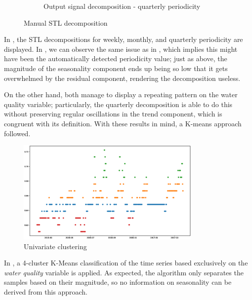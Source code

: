 \documentclass{scrartcl}
\begin{document}
\begin{figure}[ht]
\begin{subfigure}[b]{0.65\textwidth}
      \caption{Output signal decomposition - quarterly periodicity}
      \label{fig:quarterly_decomp}
    \end{subfigure}
    \caption{Manual STL decomposition}
    \label{fig:STL_manual}
  \end{figure}

  In , the STL decompositions for weekly, monthly, and quarterly periodicity are displayed. In , we can observe the same issue as in , which implies this might have been the automatically detected periodicity value; just as above, the magnitude of the seasonality component ends up being so low that it gets overwhelmed by the residual component, rendering the decomposition useless.

  On the other hand, both  manage to display a repeating pattern on the water quality variable; particularly, the quarterly decomposition is able to do this without preserving regular oscillations in the trend component, which is congruent with its definition. With these results in mind, a K-means approach followed.

  \begin{figure}[ht]
    \centering
    \includegraphics[width=0.8\textwidth]{./figures/clustered_by_output.eps}
    \caption{Univariate clustering}
    \label{fig:univariate_clustering}
  \end{figure}

  In , a 4-cluster K-Means classification of the time series based exclusively on the \textit{water quality} variable is applied. As expected, the algorithm only separates the samples based on their magnitude, so no information on seasonality can be derived from this approach.
\end{document}

